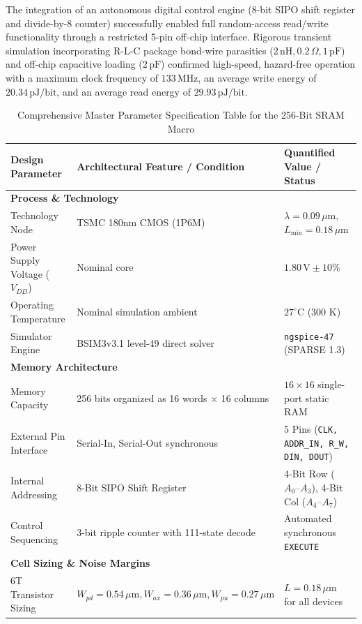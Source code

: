 \documentclass[10pt,a4paper,titlepage]{article}
\begin{document}
The integration of an autonomous digital control engine (8-bit SIPO shift register and divide-by-8 counter) successfully enabled full random-access read/write functionality through a restricted 5-pin off-chip interface. Rigorous transient simulation incorporating R-L-C package bond-wire parasitics ($2\,\text{nH}, 0.2\,\Omega, 1\,\text{pF}$) and off-chip capacitive loading ($2\,\text{pF}$) confirmed high-speed, hazard-free operation with a maximum clock frequency of $133\,\text{MHz}$, an average write energy of $20.34\,\text{pJ/bit}$, and an average read energy of $29.93\,\text{pJ/bit}$.

\begin{table}[h!]
\centering\small\sffamily
\caption{Comprehensive Master Parameter Specification Table for the 256-Bit SRAM Macro}
\begin{tabularx}{\textwidth}{lXl}
\toprule
\textbf{Design Parameter} & \textbf{Architectural Feature / Condition} & \textbf{Quantified Value / Status} \\
\midrule
\multicolumn{3}{l}{\textbf{Process \& Technology}} \\
Technology Node & TSMC 180nm CMOS (1P6M) & $\lambda = 0.09\,\mu\text{m}$, $L_{\text{min}} = 0.18\,\mu\text{m}$ \\
Power Supply Voltage ($V_{DD}$) & Nominal core & $1.80\,\text{V} \pm 10\%$ \\
Operating Temperature & Nominal simulation ambient & $27^\circ\text{C}$ (300 K) \\
Simulator Engine & BSIM3v3.1 level-49 direct solver & \texttt{ngspice-47} (SPARSE 1.3) \\
\midrule
\multicolumn{3}{l}{\textbf{Memory Architecture}} \\
Memory Capacity & 256 bits organized as 16 words $\times$ 16 columns & $16 \times 16$ single-port static RAM \\
External Pin Interface & Serial-In, Serial-Out synchronous & 5 Pins (\texttt{CLK, ADDR\_IN, R\_W, DIN, DOUT}) \\
Internal Addressing & 8-Bit SIPO Shift Register & 4-Bit Row ($A_0\text{--}A_3$), 4-Bit Col ($A_4\text{--}A_7$) \\
Control Sequencing & 3-bit ripple counter with 111-state decode & Automated synchronous \texttt{EXECUTE} \\
\midrule
\multicolumn{3}{l}{\textbf{Cell Sizing \& Noise Margins}} \\
6T Transistor Sizing & $W_{pd} = 0.54\,\mu\text{m}, W_{ax} = 0.36\,\mu\text{m}, W_{pu} = 0.27\,\mu\text{m}$ & $L = 0.18\,\mu\text{m}$ for all devices \\

\end{tabularx}
\end{table}
\end{document}
